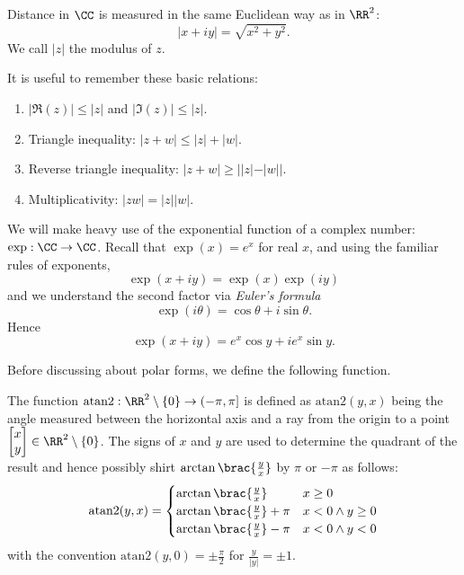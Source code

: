 \begin{definition}
Distance in $\CC$ is measured in the same Euclidean way as in $\RR^2$:
\[ |x+iy|=\sqrt{x^2+y^2}. \]
We call $|z|$ the modulus of $z$.
\end{definition}

It is useful to remember these basic relations:
\begin{enumerate}
\item $|\Re(z)|\le|z|$ and $|\Im(z)|\le|z|$.
\item Triangle inequality: $|z+w|\le|z|+|w|$.
\item Reverse triangle inequality: $|z+w|\ge||z|-|w||$.
\item Multiplicativity: $|zw|=|z||w|$.
\end{enumerate}

\begin{definition}[Exponential]
We will make heavy use of the exponential function of a complex number: $\exp:\CC\to\CC$. Recall that $\exp(x)=e^x$ for real $x$, and using the familiar rules of exponents,
\[ \exp(x+iy)=\exp(x)\exp(iy) \]
and we understand the second factor via \emph{Euler's formula}
\[ \exp(i\theta)=\cos\theta+i\sin\theta. \]
Hence
\begin{equation}
\exp(x+iy)=e^x\cos y+ie^x\sin y.
\end{equation}
\end{definition}

Before discussing about polar forms, we define the following function.

\begin{definition}
The function $\mathrm{atan2}:\RR^2\setminus\{0\}\to(-\pi,\pi]$ is defined as $\mathrm{atan2}(y,x)$ being the angle measured between the horizontal axis and a ray from the origin to a point $\begin{bmatrix}x\\y\end{bmatrix}\in\RR^2\setminus\{0\}$. The signs of $x$ and $y$ are used to determine the quadrant of the result and hence possibly shirt $\arctan\brac{\frac{y}{x}}$ by $\pi$ or $-\pi$ as follows:
\[ \mathrm{atan2}(y,x)=\begin{cases}
\arctan\brac{\frac{y}{x}} & x\ge0 \\
\arctan\brac{\frac{y}{x}}+\pi & x<0\land y\ge0\\
\arctan\brac{\frac{y}{x}}-\pi & x<0\land y<0
\end{cases} \]
with the convention $\mathrm{atan2}(y,0)=\pm\frac{\pi}{2}$ for $\frac{y}{|y|}=\pm1$.
\end{definition}

